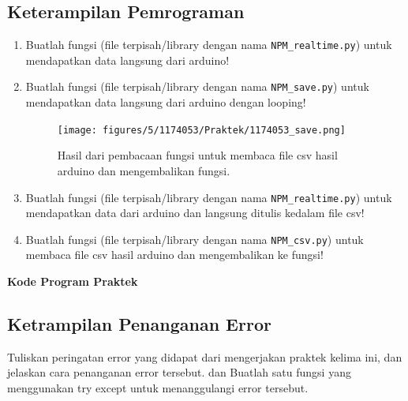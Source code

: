 \subsection{Keterampilan Pemrograman}
\begin{enumerate}
	\item Buatlah  fungsi  (file  terpisah/library  dengan  nama  \verb|NPM_realtime.py|)  untuk mendapatkan data langsung dari arduino!

	
	
	\item Buatlah fungsi (file terpisah/library dengan nama \verb|NPM_save.py|) untuk mendapatkan data langsung dari arduino dengan looping!
	
	

\begin{figure}[ht]
	\texttt{[image: figures/5/1174053/Praktek/1174053\_save.png]}
	\centering
	\caption{Hasil dari pembacaan fungsi untuk membaca file csv hasil arduino dan mengembalikan fungsi.}
\end{figure}

	\item Buatlah  fungsi  (file  terpisah/library  dengan  nama  \verb|NPM_realtime.py|) untuk mendapatkan data dari arduino dan langsung ditulis kedalam file csv!
	
	

	\item Buatlah fungsi (file terpisah/library dengan nama \verb|NPM_csv.py|) untuk membaca file csv hasil arduino dan mengembalikan ke fungsi!
	
	

\end{enumerate}

\textbf{Kode Program Praktek}

\subsection{Ketrampilan Penanganan Error}
Tuliskan  peringatan  error  yang  didapat  dari  mengerjakan  praktek  kelima  ini, dan  jelaskan  cara  penanganan  error  tersebut.   dan  Buatlah  satu  fungsi  yang menggunakan try except untuk menanggulangi error tersebut.

